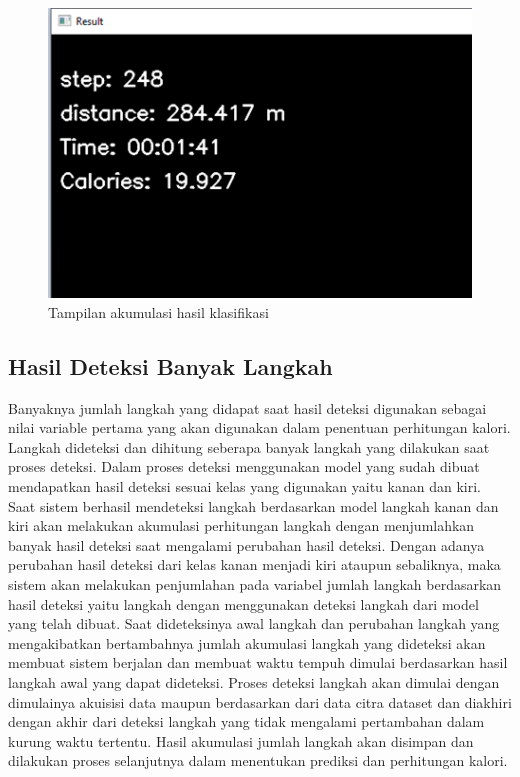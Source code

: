 \begin{figure}[H]
  \centering
  \includegraphics[scale=0.7]{gambar/hasil deteksi2.png}
  \caption{Tampilan akumulasi hasil klasifikasi}
  \label{fig:HasilDeteksi2}
\end{figure}

\subsection{Hasil Deteksi Banyak Langkah}
\label{subsec:HasilLangkah}

Banyaknya jumlah langkah yang didapat saat hasil deteksi digunakan sebagai nilai variable pertama yang akan digunakan dalam penentuan perhitungan kalori. Langkah dideteksi dan dihitung seberapa banyak langkah yang dilakukan saat proses deteksi. Dalam proses deteksi menggunakan model yang sudah dibuat mendapatkan hasil deteksi sesuai kelas yang digunakan yaitu kanan dan kiri. Saat sistem berhasil mendeteksi langkah berdasarkan model langkah kanan dan kiri akan melakukan akumulasi perhitungan langkah dengan menjumlahkan banyak hasil deteksi saat mengalami perubahan hasil deteksi. Dengan adanya perubahan hasil deteksi dari kelas kanan menjadi kiri ataupun sebaliknya, maka sistem akan melakukan penjumlahan pada variabel jumlah langkah berdasarkan hasil deteksi yaitu langkah dengan menggunakan deteksi langkah dari model yang telah dibuat. Saat dideteksinya awal langkah dan perubahan langkah yang mengakibatkan bertambahnya jumlah akumulasi langkah yang dideteksi akan membuat sistem berjalan dan membuat waktu tempuh dimulai berdasarkan hasil langkah awal yang dapat dideteksi. Proses deteksi langkah akan dimulai dengan dimulainya akuisisi data maupun berdasarkan dari data citra dataset dan diakhiri dengan akhir dari deteksi langkah yang tidak mengalami pertambahan dalam kurung waktu tertentu. Hasil akumulasi jumlah langkah akan disimpan dan dilakukan proses selanjutnya dalam menentukan prediksi dan perhitungan kalori.

